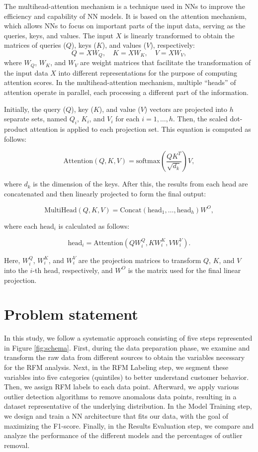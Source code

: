 \documentclass{ws-ijitdm}
\begin{document}
The multihead-attention mechanism is a technique used in NNs to improve the efficiency and capability of NN models. It is based on the attention mechanism, which allows NNs to focus on important parts of the input data, serving as the queries, keys, and values. The input $X$ is linearly transformed to obtain the matrices of queries ($Q$), keys ($K$), and values ($V$), respectively:
\[
    Q = XW_Q, \quad K = XW_K, \quad V = XW_V,
\]
where $W_Q$, $W_K$, and $W_V$ are weight matrices that facilitate the transformation of the input data $X$ into different representations for the purpose of computing attention scores. In the multihead-attention mechanism, multiple ``heads'' of attention operate in parallel, each processing a different part of the information\cite{38}.

Initially, the query ($Q$), key ($K$), and value ($V$) vectors are projected into $h$ separate sets, named $Q_i$, $K_i$, and $V_i$ for each $i = 1, \ldots, h$. Then, the scaled dot-product attention is applied to each projection set. This equation is computed as follows:

\[
\text{Attention}(Q, K, V) = \text{softmax}\left(\frac{QK^T}{\sqrt{d_k}}\right) V,
\label{eq:scaled_dot_product}
\]

where $d_k$ is the dimension of the keys. After this, the results from each head are concatenated and then linearly projected to form the final output:

\[
\text{MultiHead}(Q, K, V) = \text{Concat}(\text{head}_1, \ldots, \text{head}_h)W^O,
\label{eq:multihead}
\]

where each $\text{head}_i$ is calculated as follows:

\[
\text{head}_i = \text{Attention}(QW_i^Q, KW_i^K, VW_i^V).
\]

Here, $W_i^Q$, $W_i^K$, and $W_i^V$ are the projection matrices to transform $Q$, $K$, and $V$ into the $i$-th head, respectively, and $W^O$ is the matrix used for the final linear projection.

\section{Problem statement} \label{sec:method}

In this study, we follow a systematic approach consisting of five steps represented in Figure \ref{fig:schema}. First, during the data preparation phase, we examine and transform the raw data from different sources to obtain the variables necessary for the RFM analysis. Next, in the RFM Labeling step, we segment these variables into five categories (quintiles) to better understand customer behavior. Then, we assign RFM labels to each data point. Afterward, we apply various outlier detection algorithms to remove anomalous data points, resulting in a dataset representative of the underlying distribution. In the Model Training step, we design and train a NN architecture that fits our data, with the goal of maximizing the F1-score. Finally, in the Results Evaluation step, we compare and analyze the performance of the different models and the percentages of outlier removal.
\end{document}
